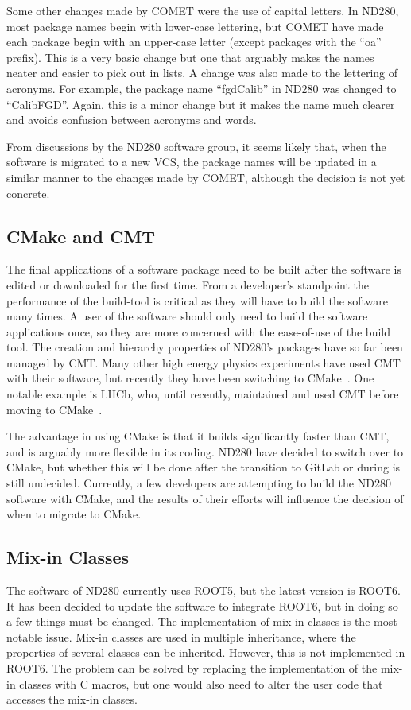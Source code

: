 \documentclass[aps,pra,12pt,notitlepage,tightenlines]{revtex4-1}
\begin{document}
Some other changes made by COMET were the use of capital letters. In ND280, most package names begin with lower-case lettering, but COMET have made each package begin with an upper-case letter (except packages with the ``oa'' prefix). This is a very basic change but one that arguably makes the names neater and easier to pick out in lists. A change was also made to the lettering of acronyms. For example, the package name ``fgdCalib'' in ND280 was changed to ``CalibFGD''. Again, this is a minor change but it makes the name much clearer and avoids confusion between acronyms and words.

From discussions by the ND280 software group, it seems likely that, when the software is migrated to a new VCS, the package names will be updated in a similar manner to the changes made by COMET, although the decision is not yet concrete.

\subsection{CMake and CMT}
The final applications of a software package need to be built after the software is edited or downloaded for the first time. From a developer's standpoint the performance of the build-tool is critical as they will have to build the software many times. A user of the software should only need to build the software applications once, so they are more concerned with the ease-of-use of the build tool. The creation and hierarchy properties of ND280's packages have so far been managed by CMT. Many other high energy physics experiments have used CMT with their software, but recently they have been switching to CMake~\cite{CMake}. One notable example is LHCb, who, until recently, maintained and used CMT before moving to CMake~\cite{Clemencic2012}.

The advantage in using CMake is that it builds significantly faster than CMT, and is arguably more flexible in its coding. ND280 have decided to switch over to CMake, but whether this will be done after the transition to GitLab or during is still undecided. Currently, a few developers are attempting to build the ND280 software with CMake, and the results of their efforts will influence the decision of when to migrate to CMake.

\subsection{Mix-in Classes}
The software of ND280 currently uses ROOT5, but the latest version is ROOT6. It has been decided to update the software to integrate ROOT6, but in doing so a few things must be changed. The implementation of mix-in classes is the most notable issue. Mix-in classes are used in multiple inheritance, where the properties of several classes can be inherited. However, this is not implemented in ROOT6. The problem can be solved by replacing the implementation of the mix-in classes with C macros, but one would also need to alter the user code that accesses the mix-in classes.
\end{document}
